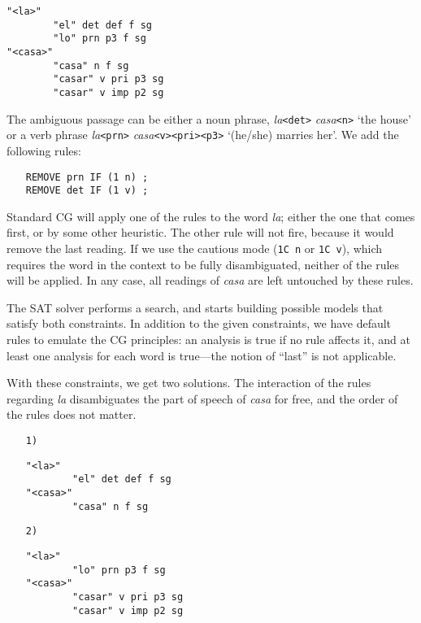 \begin{verbatim}
"<la>"
        "el" det def f sg
        "lo" prn p3 f sg
"<casa>"
        "casa" n f sg
        "casar" v pri p3 sg
        "casar" v imp p2 sg
\end{verbatim}

The ambiguous passage can be either a noun phrase, \emph{la}\texttt{<det>} \emph{casa}\texttt{<n>} 
`the house'  or a verb phrase \emph{la}\texttt{<prn>}  \emph{casa}\texttt{<v><pri><p3>} `(he/she) marries her'. 
We add the following rules:

\begin{itemize}
\item [] \texttt{REMOVE prn IF (1 n) ;} \\
             \texttt{REMOVE det IF (1 v) ;}
\end{itemize}

Standard CG will apply one  of the rules to the word \emph{la}; 
either the one that comes first, or by some other heuristic. 
The other rule will not fire, because it would remove the last
reading. 
If we use the cautious mode (\texttt{1C n} or \texttt{1C v}), which
 requires the word in the context to be fully disambiguated, 
neither of the rules will be applied.
In any case, all readings of \emph{casa} are left untouched by these rules.

The SAT solver performs a search, 
and starts building possible models that satisfy both constraints. 
In addition to the given constraints, we have default rules to emulate
the CG principles: an analysis is true if no rule affects it,
and at least one analysis for each word is true---the notion of
``last'' is not applicable.

With these constraints, we get two solutions. The interaction of the
rules regarding \emph{la}  disambiguates the part of speech of
\emph{casa} for free, and the order of the rules does not matter. 

\begin{enumerate}
\item [\texttt{1)}]
\begin{verbatim}
"<la>"
        "el" det def f sg
"<casa>"
        "casa" n f sg
\end{verbatim}
\item [\texttt{2)}]
\begin{verbatim}
"<la>"
        "lo" prn p3 f sg
"<casa>"
        "casar" v pri p3 sg
        "casar" v imp p2 sg
\end{verbatim}
\end{enumerate} 

